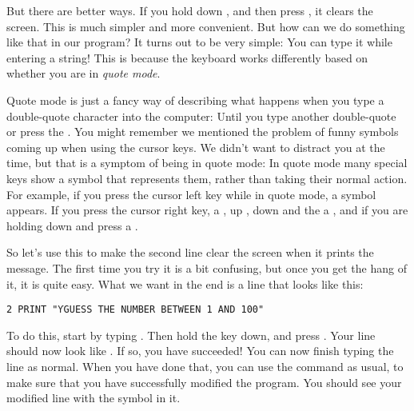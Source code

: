 But there are better ways.  If you hold down ,
and then press , it clears the
screen.  This is much simpler and more convenient. But how can we do
something like that in our program?  It turns out to be very simple:
You can type it while entering a string!  This is because the keyboard
works differently based on whether you are in {\em quote
  mode}.

Quote mode is just a fancy way of
describing what happens when you type a double-quote character into
the computer: Until you type another double-quote or press the
.  You might remember we mentioned the problem of
funny symbols coming up when using the cursor keys. We didn't want to
distract you at the time, but that is a symptom of being in quote mode:
In quote mode many special keys show a symbol that represents them,
rather than taking their normal action.  For example, if you press the
cursor left key while in quote mode, a  symbol appears. If you
press the cursor right key, a , up , down  and the
 a , and if you are holding down
 and press  a .

\needspace{3cm}
So let's use this to make the second line clear the screen when it
prints the  message.  The
first time you try it is a bit confusing, but once you get the hang of
it, it is quite easy.  What we want in the end is a line that looks
like this:

\begin{tcolorbox}[colback=black,coltext=white]
\verbatimfont{\codefont}
\begin{verbatim}
2 PRINT "ƳGUESS THE NUMBER BETWEEN 1 AND 100"
\end{verbatim}
\end{tcolorbox}

To do this, start by typing .  Then hold the
 key down, and press .
Your line should now look like .  If so, you have
succeeded! You can now finish typing the line as normal.  When you
have done that, you can use the  command as usual, to make
sure that you have successfully modified the program.   You should
see your modified line with the  symbol in it.

